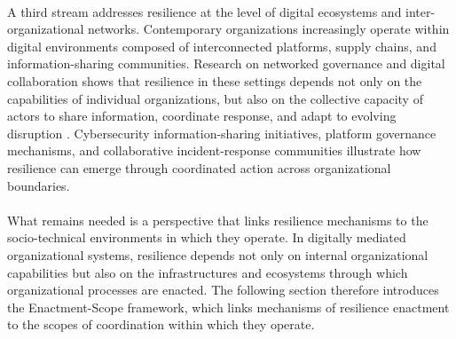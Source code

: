 \\
A third stream addresses resilience at the level of digital ecosystems and inter-organizational networks. Contemporary organizations increasingly operate within digital environments composed of interconnected platforms, supply chains, and information-sharing communities. Research on networked governance and digital collaboration shows that resilience in these settings depends not only on the capabilities of individual organizations, but also on the collective capacity of actors to share information, coordinate response, and adapt to evolving disruption \autocite{janssen2006network,liu2022network}. Cybersecurity information-sharing initiatives, platform governance mechanisms, and collaborative incident-response communities illustrate how resilience can emerge through coordinated action across organizational boundaries.\\
\\
What remains needed is a perspective that links resilience mechanisms to the socio-technical environments in which they operate. In digitally mediated organizational systems, resilience depends not only on internal organizational capabilities but also on the infrastructures and ecosystems through which organizational processes are enacted. The following section therefore introduces the Enactment-Scope framework, which links mechanisms of resilience enactment to the scopes of coordination within which they operate.
